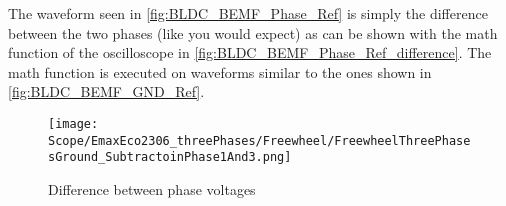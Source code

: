 The waveform seen in \autoref{fig:BLDC_BEMF_Phase_Ref} is simply the difference between the two phases (like you would expect) as can be shown with the math function of the oscilloscope in \autoref{fig:BLDC_BEMF_Phase_Ref_difference}. The math function is executed on waveforms similar to the ones shown in \autoref{fig:BLDC_BEMF_GND_Ref}.

\begin{figure}[H]
	\centering
	\texttt{[image: Scope/EmaxEco2306\_threePhases/Freewheel/FreewheelThreePhasesGround\_SubtractoinPhase1And3.png]}
	\caption{Difference between phase voltages}
	\label{fig:BLDC_BEMF_Phase_Ref_difference}
\end{figure}